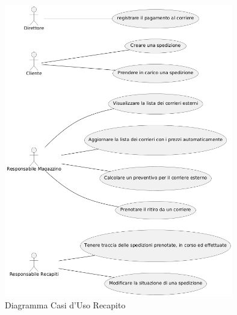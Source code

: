 \begin{figure}[H]
  \centering
  \includegraphics[width=10cm]{assets/usecase_recapito_4.png}
  \caption{Diagramma Casi d'Uso Recapito}
\end{figure}

